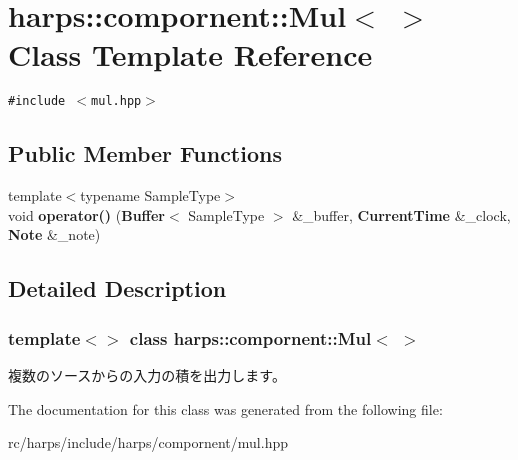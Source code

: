 \section{harps::compornent::Mul$<$ $>$ Class Template Reference}
\label{classharps_1_1compornent_1_1Mul_3_01_01_4}
{\tt \#include $<$mul.hpp$>$}

\subsection*{Public Member Functions}
\begin{CompactItemize}
\item 
{\footnotesize template$<$typename SampleType$>$ }\\void \textbf{operator()} ({\bf Buffer}$<$ SampleType $>$ \&\_\-buffer, {\bf CurrentTime} \&\_\-clock, {\bf Note} \&\_\-note)\label{classharps_1_1compornent_1_1Mul_3_01_01_4_f6a127fc62e00d7436705697f5d15c4a}

\end{CompactItemize}


\subsection{Detailed Description}
\subsubsection*{template$<$$>$ class harps::compornent::Mul$<$  $>$}

複数のソースからの入力の積を出力します。 

The documentation for this class was generated from the following file:\begin{CompactItemize}
\item 
rc/harps/include/harps/compornent/mul.hpp\end{CompactItemize}

